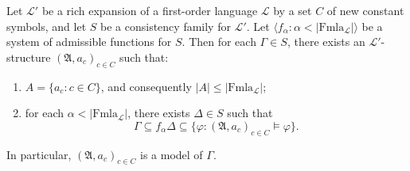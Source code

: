 \documentclass{article}
\begin{document}
Let $\mathcal{L}'$ be a rich expansion of a first-order language $\mathcal{L}$ by a set $C$ of new constant symbols, and let $S$ be a consistency family for $\mathcal{L}'$. Let $\langle f_\alpha : \alpha < |\text{Fmla}_\mathcal{L}| \rangle$ be a system of admissible functions for $S$. Then for each $\Gamma \in S$, there exists an $\mathcal{L}'$-structure $(\mathfrak{A}, a_c)_{c \in C}$ such that:

\begin{enumerate}
\item[(i)] $A = \{a_c : c \in C\}$, and consequently $|A| \leq |\text{Fmla}_\mathcal{L}|$;
\item[(ii)] for each $\alpha < |\text{Fmla}_\mathcal{L}|$, there exists $\Delta \in S$ such that
$$
\Gamma \subseteq f_\alpha \Delta \subseteq \{\varphi : (\mathfrak{A}, a_c)_{c \in C} \models \varphi\}.
$$
\end{enumerate}

In particular, $(\mathfrak{A}, a_c)_{c \in C}$ is a model of $\Gamma$.
\end{document}
